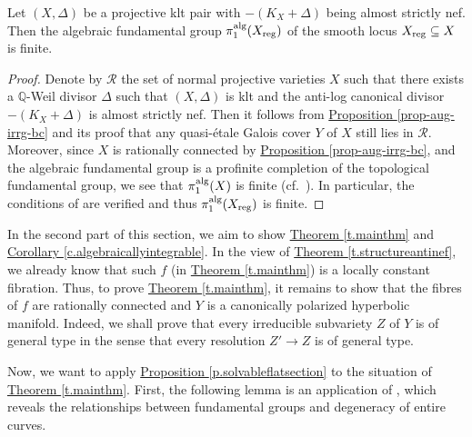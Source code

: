 \begin{prop}\label{lem-finite-reg-algpi1}
Let $(X,\Delta)$ be a projective klt pair with $-(K_X+\Delta)$ being almost strictly nef.
Then the algebraic fundamental group $\pi_1^{\textup{alg}}(X_{\textup{reg}})$ of the smooth locus $X_{\textup{reg}}\subseteq X$ is finite.
\end{prop}

\begin{proof}
Denote by $\mathcal{R}$ the set of  normal projective varieties $X$ such that there exists a $\mathbb{Q}$-Weil divisor $\Delta$ such that $(X,\Delta)$ is klt and the anti-log canonical divisor $-(K_X+\Delta)$ is almost strictly nef.
Then it follows from {\hyperref[prop-aug-irrg-bc]{Proposition \ref*{prop-aug-irrg-bc}}} and its proof that any quasi-\'etale Galois cover $Y$ of $X$ still lies in $\mathcal{R}$.
Moreover, since $X$ is rationally connected by {\hyperref[prop-aug-irrg-bc]{Proposition \ref*{prop-aug-irrg-bc}}},
 and the algebraic fundamental group is a profinite completion of the topological fundamental group, we see that $\pi_1^\textup{alg}(X)$ is finite  (cf.~\cite{Tak03}).
In particular, the conditions of \cite[Proposition 7.8]{GKP16b} are verified and thus $\pi_1^{\textup{alg}}(X_{\textup{reg}})$ is finite.
\end{proof}

\baselineskip


In the second part of this section, we aim to show {\hyperref[t.mainthm]{Theorem \ref*{t.mainthm}}} and {\hyperref[c.algebraicallyintegrable]{Corollary \ref*{c.algebraicallyintegrable}}}.
In the view of {\hyperref[t.structureantinef]{Theorem \ref*{t.structureantinef}}}, 
we already know that such $f$ (in {\hyperref[t.mainthm]{Theorem \ref*{t.mainthm}}}) is a locally constant fibration.  
Thus, to prove {\hyperref[t.mainthm]{Theorem \ref*{t.mainthm}}}, it remains to show that the fibres of $f$ are rationally connected and $Y$ is a canonically polarized hyperbolic manifold. 
Indeed, we shall prove that every irreducible subvariety $Z$ of $Y$ is of general type in the sense that every resolution $Z'\rightarrow Z$ is of general type.  

Now, we want to apply {\hyperref[p.solvableflatsection]{Proposition  \ref*{p.solvableflatsection}}} to the situation of {\hyperref[t.mainthm]{Theorem \ref*{t.mainthm}}}.  
First, the following lemma is an application of \cite[Theorem 1.1]{Yam10}, which reveals the relationships between fundamental groups and degeneracy of entire curves.

